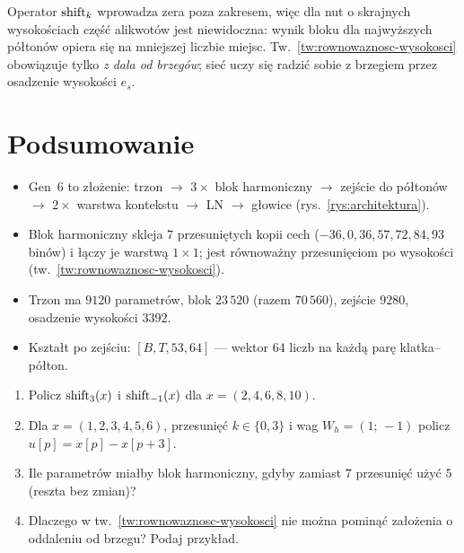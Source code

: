 \begin{pulapka}
Operator $\operatorname{shift}_k$ wprowadza zera poza zakresem, więc dla nut o skrajnych wysokościach część alikwotów jest niewidoczna: wynik bloku dla najwyższych półtonów opiera się na mniejszej liczbie miejsc.
Tw.~\ref{tw:rownowaznosc-wysokosci} obowiązuje tylko \emph{z dala od brzegów}; sieć uczy się radzić sobie z brzegiem przez osadzenie wysokości $e_s$.
\end{pulapka}

\section*{Podsumowanie}
\begin{itemize}
\item Gen~6 to złożenie: trzon $\to$ $3\times$ blok harmoniczny $\to$ zejście do półtonów $\to$ $2\times$ warstwa kontekstu $\to$ LN $\to$ głowice (rys.~\ref{rys:architektura}).
\item Blok harmoniczny skleja $7$ przesuniętych kopii cech ($-36,0,36,57,72,84,93$ binów) i łączy je warstwą $1\times1$; jest równoważny przesunięciom po wysokości (tw.~\ref{tw:rownowaznosc-wysokosci}).
\item Trzon ma $9120$ parametrów, blok $23\,520$ (razem $70\,560$), zejście $9280$, osadzenie wysokości $3392$.
\item Kształt po zejściu: $[B,T,53,64]$ --- wektor $64$ liczb na każdą parę klatka--półton.
\end{itemize}

\begin{sprawdz}
\begin{enumerate}
\item Policz $\operatorname{shift}_{3}(x)$ i $\operatorname{shift}_{-1}(x)$ dla $x=(2,4,6,8,10)$.
\item Dla $x=(1,2,3,4,5,6)$, przesunięć $k\in\{0,3\}$ i wag $W_h=(1;\,-1)$ policz $u[p]=x[p]-x[p+3]$.
\item Ile parametrów miałby blok harmoniczny, gdyby zamiast $7$ przesunięć użyć $5$ (reszta bez zmian)?
\item Dlaczego w tw.~\ref{tw:rownowaznosc-wysokosci} nie można pominąć założenia o oddaleniu od brzegu? Podaj przykład.
\end{enumerate}
\end{sprawdz}

